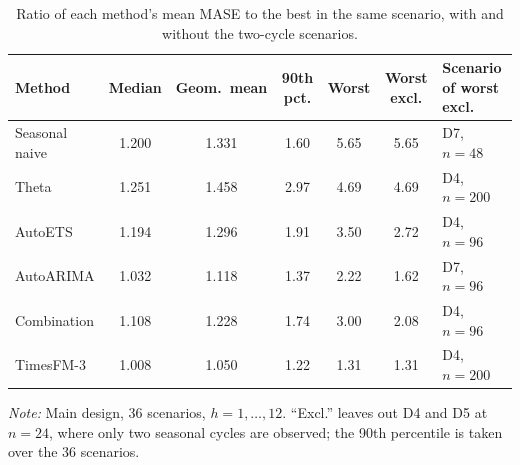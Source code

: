 \documentclass[ASNA]{USG}
\begin{document}
\begin{table}[!htbp]
\centering
\begin{threeparttable}
\caption{Ratio of each method's mean MASE to the best in the same scenario, with and without the two-cycle scenarios.}
\label{tab:si-worst}
\small\setlength{\tabcolsep}{4pt}
\begin{tabular}{lcccccl}
\toprule
Method & Median & Geom.\ mean & 90th pct. & Worst & Worst excl. & Scenario of worst excl. \\
\midrule
Seasonal naive & 1.200 & 1.331 & 1.60 & 5.65 & 5.65 & D7, $n = 48$ \\
Theta & 1.251 & 1.458 & 2.97 & 4.69 & 4.69 & D4, $n = 200$ \\
AutoETS & 1.194 & 1.296 & 1.91 & 3.50 & 2.72 & D4, $n = 96$ \\
AutoARIMA & 1.032 & 1.118 & 1.37 & 2.22 & 1.62 & D7, $n = 96$ \\
Combination & 1.108 & 1.228 & 1.74 & 3.00 & 2.08 & D4, $n = 96$ \\
TimesFM-3 & 1.008 & 1.050 & 1.22 & 1.31 & 1.31 & D4, $n = 200$ \\
\bottomrule
\end{tabular}
\begin{tablenotes}[flushleft]\footnotesize
\item \textit{Note:} Main design, 36 scenarios, $h = 1, \dots, 12$. ``Excl.'' leaves out D4 and D5 at $n = 24$, where only two seasonal cycles are observed; the 90th percentile is taken over the 36 scenarios.
\end{tablenotes}
\end{threeparttable}
\end{table}


\end{document}
